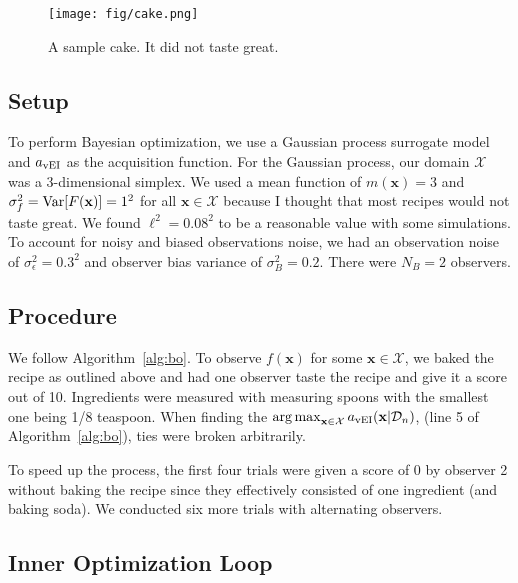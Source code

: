 \begin{figure}
    \centering
    \texttt{[image: fig/cake.png]}
    \caption{A sample cake. It did not taste great.}
    \label{fig:cake}
\end{figure}

\subsection{Setup}\label{ssec:setup}

To perform Bayesian optimization, we use a Gaussian process surrogate model and $a_{\mathrm{vEI}}$ as the acquisition function.
For the Gaussian process, our domain $\mathcal{X}$ was a 3-dimensional simplex.
We used a mean function of $m(\mathbf{x}) = 3$ and $\sigma^2_f = \operatorname{Var}[F(\mathbf{x})] = 1 ^ 2$ for all $\mathbf{x} \in \mathcal{X}$ because
I thought that most recipes would not taste great.
We found $\ell^2 = 0.08^2$ to be a reasonable value with some simulations.
To account for noisy and biased observations noise, we had an observation noise of $\sigma^2_{\epsilon} = 0.3 ^ 2$ and observer bias variance of $\sigma_B^2 = 0.2$.
There were $N_B = 2$ observers.

\subsection{Procedure}\label{ssec:procedure}

We follow Algorithm~\ref{alg:bo}.
To observe $f(\mathbf{x})$ for some $\mathbf{x} \in \mathcal{X}$, we baked the recipe as outlined above and had one observer taste the recipe and give it a score out of 10.
Ingredients were measured with measuring spoons with the smallest one being 1/8 teaspoon.
When finding the $\operatorname*{arg\,max}_{\mathbf{x} \in \mathcal{X} } a_{\mathrm{vEI}}( \mathbf{x} | \mathcal{D}_n)$, (line 5 of Algorithm~\ref{alg:bo}), ties were broken arbitrarily.

To speed up the process, the first four trials were given a score of 0 by observer 2 without baking the recipe since they effectively consisted of one ingredient (and baking soda).
We conducted six more trials with alternating observers.

\subsection{Inner Optimization Loop}\label{ssec:inner-opt}

